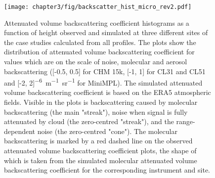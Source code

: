 \begin{figure}[p]
\centerline{\texttt{[image: chapter3/fig/backscatter\_hist\_micro\_rev2.pdf]}}
\caption[Attenuated volume backscattering coefficient histograms as a function of height]{
Attenuated volume backscattering coefficient histograms as a function of height observed and simulated
at three different sites of the case studies calculated from all profiles.
The plots show the distribution
of attenuated volume backscattering coefficient for values which are on the scale of noise, molecular and
aerosol backscattering ([-0.5, 0.5] for CHM 15k, [-1, 1] for CL31 and CL51 and
[-2, 2]\unit{^{-6}m^{-1}sr^{-1}} for MiniMPL).
The simulated attenuated volume backscattering coefficient is based on the ERA5
atmospheric fields. Visible in the plots is backscattering caused by molecular
backscattering (the main "streak"), noise when signal is fully attenuated by cloud
(the zero-centred "streak"), and the range-dependent noise
(the zero-centred "cone"). The molecular backscattering is marked by a red dashed
line on the observed attenuated volume backscattering coefficient plots, the shape of which is taken from
the simulated molecular attenuated volume backscattering coefficient for the corresponding instrument and site.
\vspace{6pt}
}
\label{fig:3:micro-backscatter}
\end{figure}

